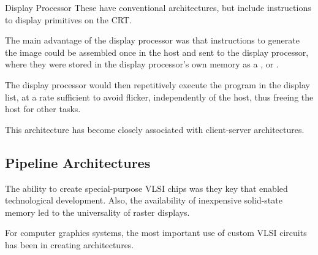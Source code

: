 \documentclass[\main/notes.tex]{subfiles}
\begin{document}
        \begin{definition}{Display Processor}
          These have conventional architectures,
          but include instructions to display primitives on the CRT.

          The main advantage of the display processor
          was that instructions to generate the image
          could be assembled once in the host and sent to the display processor,
          where they were stored in the display processor's own memory
          as a , or .

          The display processor would then
          repetitively execute the program in the display list,
          at a rate sufficient to avoid flicker,
          independently of the host,
          thus freeing the host for other tasks.
        \end{definition}

        This architecture has become closely associated with
        client-server architectures.

      \subsection{Pipeline Architectures}
        The ability to create special-purpose VLSI chips
        was they key that enabled technological development.
        Also, the availability of inexpensive solid-state memory
        led to the universality of raster displays.

        For computer graphics systems,
        the most important use of custom VLSI circuits has been in creating
         architectures.
\end{document}
